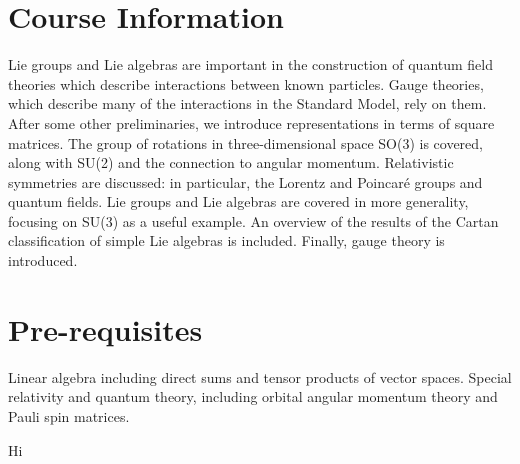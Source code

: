 \documentclass[a4paper,11pt]{article}
\begin{document}
	\maketitlepage
	\preliminaries

	\section*{Course Information}

	Lie groups and Lie algebras are important in the construction of quantum field theories which describe interactions between known particles. Gauge theories, which describe many of the interactions in the Standard Model, rely on them. After some other preliminaries, we introduce representations in terms of square matrices. The group of rotations in three-dimensional space SO(3) is covered, along with SU(2) and the connection to angular momentum. Relativistic symmetries are discussed: in particular, the Lorentz and Poincar\'e groups and quantum fields. Lie groups and Lie algebras are covered in more generality, focusing on SU(3) as a useful example. An overview of the results of the Cartan classification of simple Lie algebras is included. Finally, gauge theory is introduced.
	
	\section*{Pre-requisites}

	Linear algebra including direct sums and tensor products of vector spaces. Special relativity and quantum theory, including orbital angular momentum theory and Pauli spin matrices.
  
	\newpage
	\tableofcontents
	\newpage
	\maintext
	Hi

	
\end{document}
